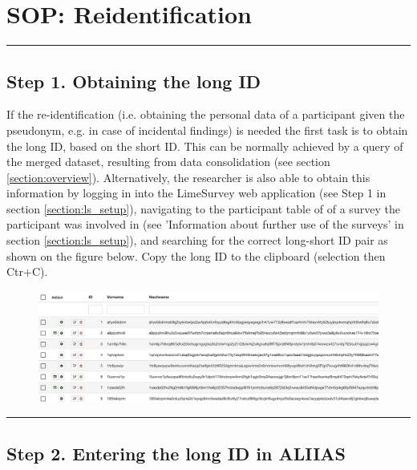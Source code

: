 \pagebreak
\section{SOP: Reidentification}
\label{section:sop_reidentification}

\par\noindent\rule{\textwidth\color{pniblue}}{0.4pt}
\subsection*{Step 1. Obtaining the long ID}

If the re-identification (i.e. obtaining the personal data of a participant given the pseudonym, e.g. in case of incidental findings) is needed the first task is to obtain the long ID, based on the short ID.
This can be normally achieved by a query of the merged dataset, resulting from data consolidation (see section \ref{section:overview}). Alternatively, the researcher is also able to obtain this information by logging in into the LimeSurvey web application (see Step 1 in section \ref{section:ls_setup}), navigating to the participant table of of a survey the participant was involved in (see 'Information about further use of the surveys' in section \ref{section:ls_setup}), and searching for the correct long-short ID pair as shown on the figure below.
Copy the long ID to the clipboard (selection then Ctr+C).

\begin{figure}[H]
\includegraphics[width=1.0\textwidth]{docs/fig/ls_pseudonyms.png}
\end{figure}


\par\noindent\rule{\textwidth\color{pniblue}}{0.4pt}
\subsection*{Step 2. Entering the long ID in ALIIAS}

